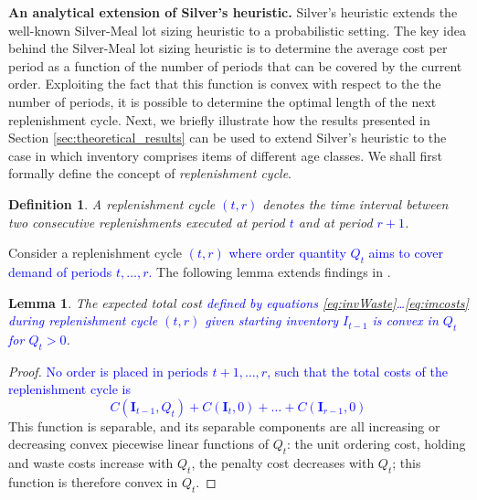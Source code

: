\documentclass{tPRS2e}
\newcommand{\blue}{\textcolor{blue}}
\newtheorem{lem}{Lemma}
\newtheorem{mydef}{Definition}
\begin{document}
\vspace{1em}
\noindent
{\bf An analytical extension of Silver's heuristic.} Silver's heuristic \citep{citeulike:7292564} extends the well-known Silver-Meal lot sizing heuristic \cite{SilverMeal1973} to a probabilistic setting. The key idea behind the Silver-Meal lot sizing heuristic is to determine the average cost per period as a function of the number of periods that can be covered by the current order. Exploiting the fact that this function is convex with respect to the the number of periods, it is possible to determine the optimal length of the next replenishment cycle. Next, we briefly illustrate how the results presented in Section \ref{sec:theoretical_results} can be used to extend Silver's heuristic to the case in which inventory comprises items of different age classes. We shall first formally define the concept of {\em replenishment cycle}.
	\begin{mydef}
		A replenishment cycle \blue{$(t,r)$} denotes the time interval between two consecutive replenishments executed at period \blue{$t$} and at period \blue{$r+1$}.
	\end{mydef}
	
	Consider a replenishment cycle \blue{$(t,r)$ where order quantity $Q_t$ aims to cover demand  of periods $t,\ldots,r$.} %
	The following lemma extends findings in \cite{Federgruen}.
	\begin{lem}\label{lem:convexity}
		The expected total cost \blue{defined by equations \eqref{eq:invWaste}\ldots \eqref{eq:imcosts} during replenishment cycle $(t,r)$ given starting inventory $I_{t-1}$ is convex in $Q_t$ for $Q_t>0$}.
	\end{lem}
	\begin{proof}
		\blue{No order is placed in periods $t+1,\ldots,r$, such that the total costs of the replenishment cycle is}
		\blue{
		\[C(\mathbf{I}_{t-1},Q_t)+C(\mathbf{I}_t,0)+\ldots+C(\mathbf{I}_{r-1},0)\]}
		This function is separable, and its separable components are all increasing or decreasing convex piecewise linear functions of $Q_t$: the unit ordering cost, holding and waste costs increase with $Q_t$, the penalty cost decreases with $Q_t$; this function is therefore convex in $Q_t$.%
	\end{proof}
	\noindent
	
\end{document}
